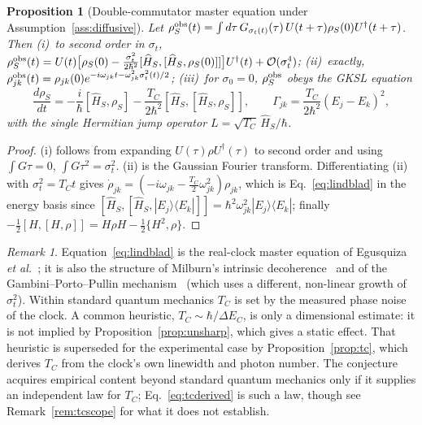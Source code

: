 \documentclass[aps,prd,onecolumn,notitlepage,10pt,amsmath,amssymb,amsfonts,nofootinbib]{revtex4-2}
\newtheorem{proposition}{Proposition}
\theoremstyle{definition}
\theoremstyle{remark}
\newtheorem{remark}{Remark}
\newcommand{\Hs}{\widehat{H}_S}
\begin{document}
\begin{proposition}[Double-commutator master equation under Assumption~\ref{ass:diffusive}]
\label{prop:lindblad}
Let $\rho_S^{\rm obs}(t)=\int d\tau\,G_{\sigma_t(t)}(\tau)\,U(t+\tau)\rho_S(0)U^\dagger(t+\tau)$. Then (i)~to second order in $\sigma_t$, $\rho_S^{\rm obs}(t)=U(t)\big[\rho_S(0)-\frac{\sigma_t^2}{2\hbar^2}[\Hs,[\Hs,\rho_S(0)]]\big]U^\dagger(t)+\mathcal O(\sigma_t^4)$; (ii)~exactly, $\rho^{\rm obs}_{jk}(t)=\rho_{jk}(0)e^{-i\omega_{jk}t-\omega_{jk}^2\sigma_t^2(t)/2}$; (iii)~for $\sigma_0=0$, $\rho_S^{\rm obs}$ obeys the GKSL equation
\begin{equation}
  \frac{d\rho_S}{dt}=-\frac{i}{\hbar}[\Hs,\rho_S]-\frac{T_C}{2\hbar^2}[\Hs,[\Hs,\rho_S]],\qquad
  \Gamma_{jk}=\frac{T_C}{2\hbar^2}(E_j-E_k)^2,
  \label{eq:lindblad}
\end{equation}
with the single Hermitian jump operator $L=\sqrt{T_C}\,\Hs/\hbar$.
\end{proposition}

\begin{proof}
(i) follows from expanding $U(\tau)\rho U^\dagger(\tau)$ to second order and using $\int G\tau=0$, $\int G\tau^2=\sigma_t^2$. (ii) is the Gaussian Fourier transform. Differentiating (ii) with $\sigma_t^2=T_Ct$ gives $\dot\rho_{jk}=(-i\omega_{jk}-\frac{T_C}{2}\omega_{jk}^2)\rho_{jk}$, which is Eq.~\eqref{eq:lindblad} in the energy basis since $[\Hs,[\Hs,|E_j\rangle\langle E_k|]]=\hbar^2\omega_{jk}^2|E_j\rangle\langle E_k|$; finally $-\frac12[H,[H,\rho]]=H\rho H-\frac12\{H^2,\rho\}$.
\end{proof}

\begin{remark}
Equation~\eqref{eq:lindblad} is the real-clock master equation of Egusquiza \emph{et al.}~\cite{Egusquiza1999}; it is also the structure of Milburn's intrinsic decoherence~\cite{Milburn1991} and of the Gambini--Porto--Pullin mechanism~\cite{Gambini2004} (which uses a different, non-linear growth of $\sigma_t^2$). Within standard quantum mechanics $T_C$ is set by the measured phase noise of the clock. A common heuristic, $T_C\sim\hbar/\Delta E_C$, is only a dimensional estimate: it is not implied by Proposition~\ref{prop:unsharp}, which gives a static effect. That heuristic is superseded for the experimental case by Proposition~\ref{prop:tc}, which derives $T_C$ from the clock's own linewidth and photon number. The conjecture acquires empirical content beyond standard quantum mechanics only if it supplies an independent law for $T_C$; Eq.~\eqref{eq:tcderived} is such a law, though see Remark~\ref{rem:tcscope} for what it does not establish.
\end{remark}
\end{document}
